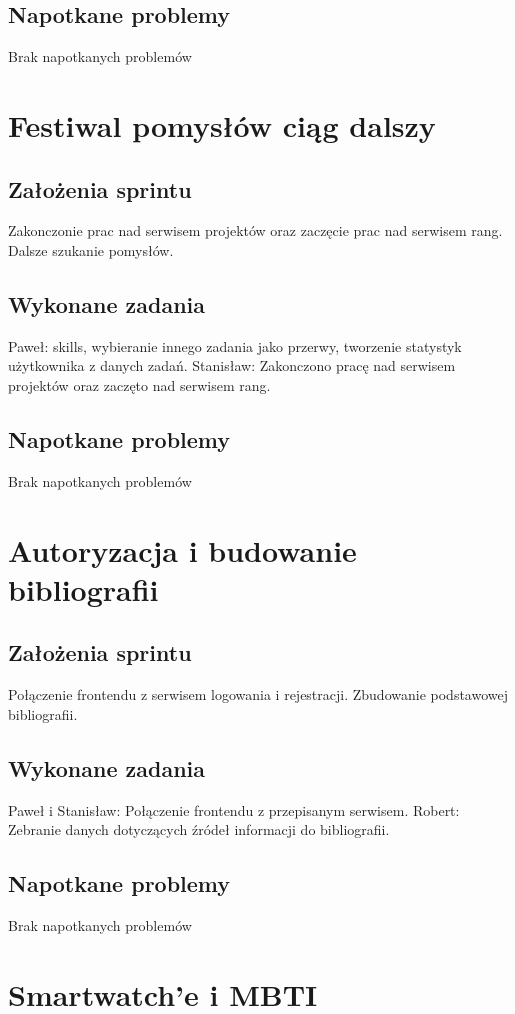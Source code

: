 \documentclass[a4paper,11pt]{report}
\begin{document}
\subsection {Napotkane problemy}
Brak napotkanych problemów

\section {Festiwal pomysłów ciąg dalszy}
\subsection {Założenia sprintu}
Zakonczonie prac nad serwisem projektów oraz zaczęcie prac nad serwisem rang. Dalsze szukanie pomysłów.
\subsection {Wykonane zadania}
Paweł: skills, wybieranie innego zadania jako przerwy, tworzenie statystyk użytkownika z danych zadań.
Stanisław: Zakonczono pracę nad serwisem projektów oraz zaczęto nad serwisem rang.
\subsection {Napotkane problemy}
Brak napotkanych problemów

\section {Autoryzacja i budowanie bibliografii}
\subsection {Założenia sprintu}
Połączenie frontendu z serwisem logowania i rejestracji. Zbudowanie podstawowej bibliografii.
\subsection {Wykonane zadania}
Paweł i Stanisław: Połączenie frontendu z przepisanym serwisem.
Robert: Zebranie danych dotyczących źródeł informacji do bibliografii.
\subsection {Napotkane problemy}
Brak napotkanych problemów

\section {Smartwatch'e i MBTI}
\end{document}
